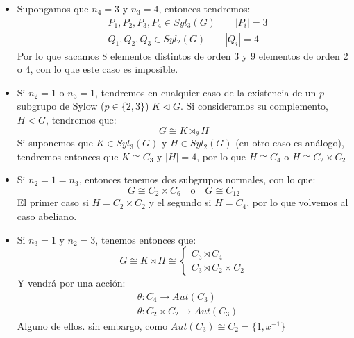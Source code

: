 \begin{itemize}
    \item Supongamos que $n_4 = 3$ y $n_3 = 4$, entonces tendremos:
        \begin{align*}
            &P_1,P_2,P_3,P_4 \in Syl_3(G) \qquad |P_i| = 3 \\
            &Q_1,Q_2,Q_3 \in Syl_2(G) \qquad |Q_i| = 4
        \end{align*}
        Por lo que sacamos $8$ elementos distintos de orden 3 y 9 elementos de orden 2 o 4, con lo que este caso es imposible.
    \item Si $n_2 = 1$ o $n_3 = 1$, tendremos en cualquier caso de la existencia de un $p-$subgrupo de Sylow ($p\in \{2,3\}$) $K\lhd G$. Si consideramos su complemento, $H<G$, tendremos que:
        \begin{equation*}
            G\cong K\rtimes_\theta H
        \end{equation*}
        Si suponemos que $K\in Syl_3(G)$ y $H\in Syl_2(G)$ (en otro caso es análogo), tendremos entonces que $K\cong C_3$ y $|H| = 4$, por lo que $H \cong C_4$ o $H\cong C_2\times C_2$
    \item Si $n_2 = 1 = n_3$, entonces tenemos dos subgrupos normales, con lo que:
        \begin{equation*}
            G\cong C_2\times C_6 \quad \text{o} \quad G\cong C_{12}
        \end{equation*}
        El primer caso si $H = C_2\times C_2$ y el segundo si $H=C_4$, por lo que volvemos al caso abeliano.
    \item Si $n_3 = 1$ y $n_2 = 3$, tenemos entonces que:
        \begin{equation*}
            G\cong K\rtimes H \cong \left\{\begin{array}{l}
                C_3\rtimes C_4 \\
                C_3 \rtimes C_2 \times C_2
            \end{array}\right.
        \end{equation*}
        Y vendrá por una acción:
        \begin{align*}
            &\theta:C_4 \to Aut(C_3) \\
            &\theta:C_2\times C_2 \to Aut(C_3)
        \end{align*}
        Alguno de ellos. sin embargo, como $Aut(C_3)\cong C_2 = \{1,x^{-1}\}$
\end{itemize}

